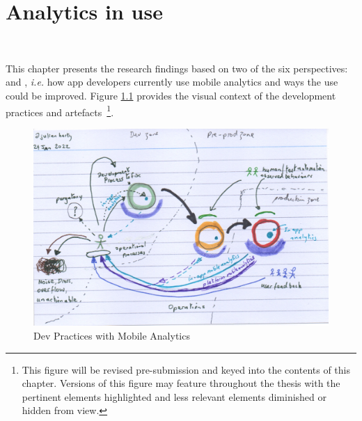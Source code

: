 \chapter{Analytics in use}~\label{chapter-analytics-in-use}

This chapter presents the research findings based on two of the six perspectives: \uuse and \iuse, \emph{i.e.} how app developers currently use mobile analytics and ways the use could be improved. Figure \ref{fig:dev-practices-with-mobile-analytics} provides the visual context of the development practices and artefacts~\footnote{This figure will be revised pre-submission and keyed into the contents of this chapter. Versions of this figure may feature throughout the thesis with the pertinent elements highlighted and less relevant elements diminished or hidden from view.}.

\begin{figure}
    \centering
    \includegraphics[width=12cm]{images/rough-sketches/dev-practices-with-mobile-analytics-24-jan-2022.jpeg}
    \caption{Dev Practices with Mobile Analytics}
    \label{fig:dev-practices-with-mobile-analytics}
\end{figure}


